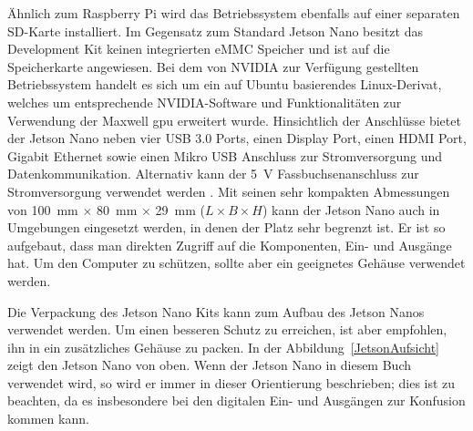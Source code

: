 Ähnlich zum Raspberry Pi wird das Betriebssystem ebenfalls auf einer separaten SD-Karte installiert. Im Gegensatz zum Standard Jetson Nano besitzt das Development Kit keinen integrierten eMMC Speicher und ist auf die Speicherkarte angewiesen. Bei dem von NVIDIA zur Verfügung gestellten Betriebssystem handelt es sich um ein auf Ubuntu basierendes Linux-Derivat, welches um entsprechende NVIDIA-Software und Funktionalitäten zur Verwendung der Maxwell \ac{gpu} erweitert wurde. Hinsichtlich der Anschlüsse bietet der Jetson Nano neben vier USB 3.0 Ports, einen Display Port, einen HDMI Port, Gigabit Ethernet sowie einen Mikro USB Anschluss zur Stromversorgung und Datenkommunikation. Alternativ kann der \SI{5}{\volt} Fassbuchsenanschluss zur Stromversorgung verwendet werden \cite{JetsonDatasheet:2019}.
Mit seinen sehr kompakten Abmessungen von \SI{100}{\milli\meter} $\times$ \SI{80}{\milli\meter} $\times$ \SI{29}{\milli\meter} ($L \times B \times H$) kann der Jetson Nano auch in Umgebungen eingesetzt werden, in denen der Platz sehr begrenzt ist. Er ist so aufgebaut, dass man direkten Zugriff auf die Komponenten, Ein- und Ausgänge hat. Um den Computer zu schützen, sollte aber ein geeignetes Gehäuse verwendet werden.

Die Verpackung des Jetson Nano Kits kann zum Aufbau des Jetson Nanos verwendet werden.  Um einen besseren Schutz
zu erreichen, ist aber empfohlen, ihn in ein zusätzliches Gehäuse zu packen. In der Abbildung~\ref{JetsonAufsicht}
zeigt den Jetson Nano von oben. Wenn der Jetson Nano in diesem Buch verwendet wird, so wird er immer in dieser Orientierung beschrieben; dies ist zu beachten, da es insbesondere bei den digitalen Ein- und Ausgängen zur Konfusion kommen kann.


%	
%	


